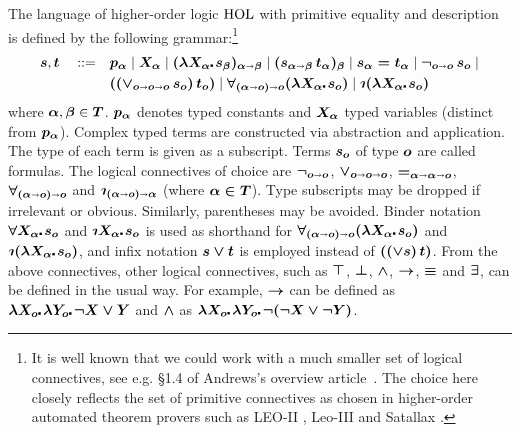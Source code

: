 \begin{definition}\label{holgrammar}
The language of higher-order logic $\text{\textrm{HOL}}$ with primitive equality and
description is defined by the following
grammar:\footnote{It is well known that we could work with a much smaller set
  of logical connectives, see e.g. \S1.4 of Andrews's overview
  article~\cite{AndrewsSEP}. The choice here closely reflects the
  set of primitive connectives as chosen in higher-order automated theorem provers such
  as LEO-II \cite{LEO}, Leo-III \cite{Leo-III} and Satallax \cite{Satallax}.}
\begin{align*} 
  \hol{s},\hol{t} \quad ::= \quad & \hol{p_\alpha} \mid \hol{X_\alpha} \mid \hol{(\lam{X_\alpha}
  s_\beta)_{\alpha\ar\beta}} \mid \hol{(s_{\alpha\ar\beta}\,
                                    t_\alpha)_\beta} \mid
                                    \hol{s_\alpha = t_\alpha} \mid
                                    \hol{\neg_{o\ar o}\, s_o} \mid\\
  & \hol{(({\vee_{o\ar o\ar o}}\,s_o)\,t_o)} \mid \hol{\forall_{(\alpha\ar
    o)\ar o}(\lam{X_\alpha} s_o)} \mid \hol{\Descr(\lam{X_\alpha} s_o)}
\end{align*}
where $\boldsymbol{\alpha},\boldsymbol{\beta}\in \boldsymbol{T}$. $\boldsymbol{p_\alpha}$ denotes typed constants and
$\boldsymbol{X_\alpha}$ typed variables (distinct from $\boldsymbol{p_\alpha}$).  Complex typed
terms are constructed via abstraction and application. The type of
each term is given as a subscript.  Terms $\boldsymbol{s_o}$ of type $\boldsymbol{o}$ are called
formulas.  The logical connectives of choice are
$\boldsymbol{\neg_{o\shortrightarrow o}}$, $\boldsymbol{\vee_{o\shortrightarrow
  o\shortrightarrow o}}$, $\boldsymbol{=_{\alpha\shortrightarrow\alpha\shortrightarrow  o}}$, $\boldsymbol{\forall_{(\alpha\shortrightarrow
  o)\shortrightarrow o}}$ and $\hol{\Descr_{(\alpha\ar
  o)\ar \alpha}}$ (where $\boldsymbol{\alpha\in T}$).  Type subscripts may be dropped if
irrelevant or obvious. Similarly, parentheses may be avoided.  Binder
notation $\hol{\all{X_\alpha} s_o}$ and $\hol{\Descr {X_\alpha}\lambdot s_o}$ is used as shorthand for
$\hol{\forall_{(\alpha\ar o)\ar o}
(\lam{X_\alpha} s_o)}$ and $\hol{\Descr(\lam{X_\alpha} s_o)}$, and infix notation $\boldsymbol{s \vee t}$ is employed
instead of $\boldsymbol{((\vee s)\, t)}$. From the above connectives, other logical
connectives, such as $\boldsymbol{\top}$, $\boldsymbol{\bot}$, $\boldsymbol{\wedge}$,
$\boldsymbol{\rightarrow}$, $\boldsymbol{\equiv}$ and $\boldsymbol{\exists}$, can be defined in
the usual way. For example, $\boldsymbol{\rightarrow}$ can be defined as $\hol{\lam{X_o}\lam{Y_o}
  \neg X \vee Y}$ and $\boldsymbol{\wedge}$ as $\hol{\lam{X_o}\lam{Y_o}
  \neg (\neg X \vee \neg Y)}$.
\end{definition}

